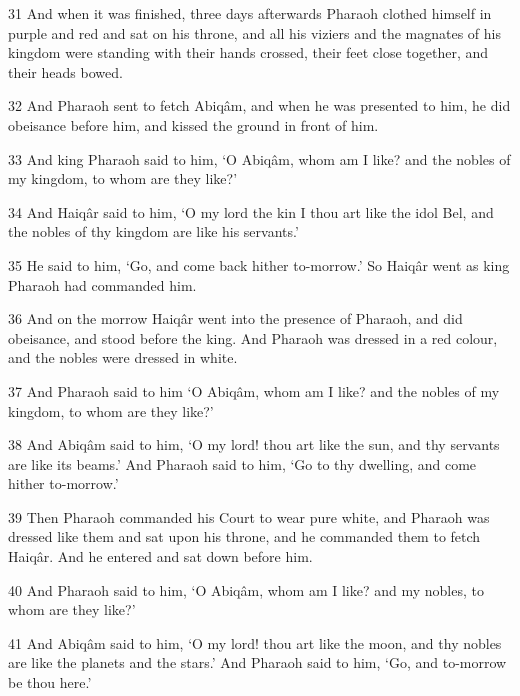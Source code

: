 \par 31 And when it was finished, three days afterwards Pharaoh clothed himself in purple and red and sat on his throne, and all his viziers and the magnates of his kingdom were standing with their hands crossed, their feet close together, and their heads bowed.

\par 32 And Pharaoh sent to fetch Abiqâm, and when he was presented to him, he did obeisance before him, and kissed the ground in front of him.

\par 33 And king Pharaoh said to him, ‘O Abiqâm, whom am I like? and the nobles of my kingdom, to whom are they like?’

\par 34 And Haiqâr said to him, ‘O my lord the kin I thou art like the idol Bel, and the nobles of thy kingdom are like his servants.’

\par 35 He said to him, ‘Go, and come back hither to-morrow.’ So Haiqâr went as king Pharaoh had commanded him.

\par 36 And on the morrow Haiqâr went into the presence of Pharaoh, and did obeisance, and stood before the king. And Pharaoh was dressed in a red colour, and the nobles were dressed in white.

\par 37 And Pharaoh said to him ‘O Abiqâm, whom am I like? and the nobles of my kingdom, to whom are they like?’

\par 38 And Abiqâm said to him, ‘O my lord! thou art like the sun, and thy servants are like its beams.’ And Pharaoh said to him, ‘Go to thy dwelling, and come hither to-morrow.’

\par 39 Then Pharaoh commanded his Court to wear pure white, and Pharaoh was dressed like them and sat upon his throne, and he commanded them to fetch Haiqâr. And he entered and sat down before him.

\par 40 And Pharaoh said to him, ‘O Abiqâm, whom am I like? and my nobles, to whom are they like?’

\par 41 And Abiqâm said to him, ‘O my lord! thou art like the moon, and thy nobles are like the planets and the stars.’ And Pharaoh said to him, ‘Go, and to-morrow be thou here.’

